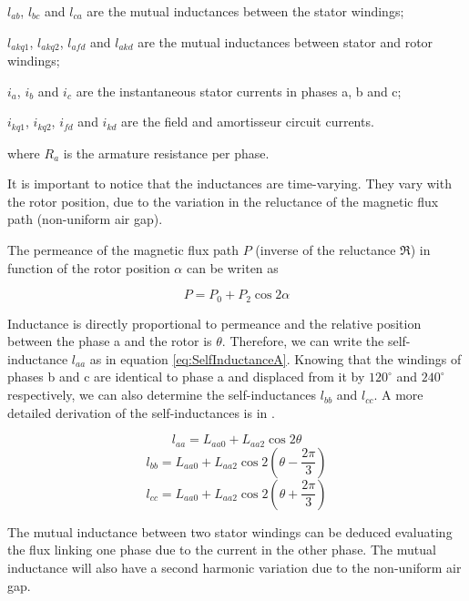 $l_{ab}$, $l_{bc}$ and $l_{ca}$ are the mutual inductances between the stator windings;

$l_{akq1}$, $l_{akq2}$, $l_{afd}$ and $l_{akd}$ are the mutual inductances between stator and rotor windings;

$i_a$, $i_b$ and $i_c$ are the instantaneous stator currents in phases a, b and c;

$i_{kq1}$, $i_{kq2}$, $i_{fd}$ and $i_{kd}$ are the field and amortisseur circuit currents.
 


where $R_a$ is the armature resistance per phase.

It is important to notice that the inductances are time-varying. They vary with the rotor position, due to the variation in the reluctance of the magnetic flux path (non-uniform air gap). 

The permeance of the magnetic flux path $P$ (inverse of the reluctance $\Re$) in function of the rotor position $\alpha$ can be writen as

\begin{equation}
	P = P_0 + P_2 \cos 2 \alpha
\end{equation}

Inductance is directly proportional to permeance and the relative position between the phase a and the rotor is $\theta$. Therefore, we can write the self-inductance $l_{aa}$ as in equation \ref{eq:SelfInductanceA}. Knowing that the windings of phases b and c are identical to phase a and displaced from it by  $120^{\circ}$ and $240^{\circ}$ respectively, we can also determine the self-inductances $l_{bb}$ and $l_{cc}$. A more detailed derivation of the self-inductances is in \cite{kundur1994power}.

\begin{equation} \label{eq:SelfInductanceA}
	l_{aa} = L_{aa0} + L_{aa2} \cos 2 \theta
\end{equation}
\begin{equation} \label{eq:SelfInductanceB}
	l_{bb} = L_{aa0} + L_{aa2} \cos 2 (\theta - \frac{2 \pi}{3})
\end{equation}
\begin{equation} \label{eq:SelfInductanceC}
	l_{cc} = L_{aa0} + L_{aa2} \cos 2 (\theta + \frac{2 \pi}{3})
\end{equation}

The mutual inductance between two stator windings can be deduced evaluating the flux linking one phase due to the current in the other phase. The mutual inductance will also have a second harmonic variation due to the non-uniform air gap.

